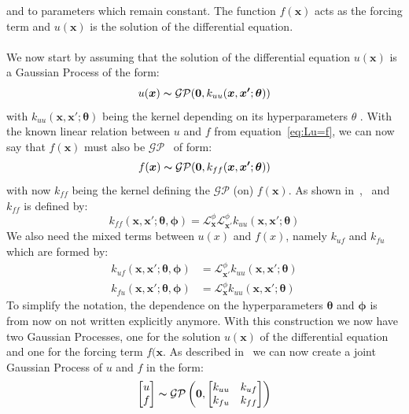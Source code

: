 \documentclass{article}
\begin{document}
and to parameters which remain constant. The function $f(\bm{x})$ acts as the forcing term and $u(\bm{x})$ is the solution of the differential equation.  \\
\\
We now start by assuming that the solution of the differential equation $u(\bm{x})$ is a Gaussian Process of the form:
\begin{equation}
    u(\bm{x}) \thicksim \mathcal{G}\mathcal{P}(\bm{0},k_{uu}(\bm{x},\bm{x'};\bm{\theta}))
\end{equation}
with $k_{uu}(\bm{x},\bm{x'};\bm{\theta})$ being the kernel depending on its hyperparameters $\theta$ . With the known linear relation between $u$ and $f$ from equation~\ref{eq:Lu=f}, we can now say that $f(\bm{x})$ must also be $\mathcal{G}\mathcal{P}$~\cite{RasmussenCarlEdward} of form:
\begin{equation}
    f(\bm{x}) \thicksim \mathcal{G}\mathcal{P}(\bm{0},k_{ff}(\bm{x},\bm{x'};\bm{\theta}))
\end{equation}
with now $k_{ff}$ being the kernel defining the $\mathcal{G}\mathcal{P}$ (on) $f(\bm{x})$. As shown in~\cite{garnett_2023_full},~\cite{Särkkä} and~\cite{RAISSI} $k_{ff}$ is defined by:
\begin{equation}
    \label{eq:kff}
    k_{ff}(\bm{x},\bm{x'};\bm{\theta}, \bm{\phi}) = \mathcal{L}_{\bm{x}}^\phi \mathcal{L}_{\bm{x'}}^\phi k_{uu}(\bm{x},\bm{x'};\bm{\theta})
\end{equation}
We also need the mixed terms between $u(x)$ and $f(x)$, namely $k_{uf}$ and $k_{fu}$ which are formed by:
\begin{equation}
    \label{eq:kuf_kfu}
    \begin{aligned}
        k_{uf}(\bm{x,x'};\bm{\theta,\phi}) & = \mathcal{L}_{\bm{x'}}^\phi k_{uu}(\bm{x},\bm{x'};\bm{\theta}) \\
        k_{fu}(\bm{x,x'};\bm{\theta,\phi}) & = \mathcal{L}_{\bm{x}}^\phi k_{uu}(\bm{x},\bm{x'};\bm{\theta})
    \end{aligned}
\end{equation}
To simplify the notation, the dependence on the hyperparameters $\bm{\theta}$ and $\bm{\phi}$ is from now on not written explicitly anymore.
With this construction we now have two Gaussian Processes, one for the solution $u(\bm{x})$ of the differential equation and one for the forcing term $f(\bm{x}$. As described in~\cite{garnett_2023_full} we can now create a joint Gaussian Process of $u$ and $f$ in the form:
\begin{equation}
    \label{eq:jointGP}
    \begin{aligned}
        \begin{bmatrix}
            u \\
            f
        \end{bmatrix}
    \end{aligned}
    \thicksim \mathcal{GP}\left(\bm{0},
    \begin{bmatrix}
        k_{uu} & k_{uf} \\
        k_{fu} & k_{ff}
    \end{bmatrix}\right)
\end{equation}
\end{document}
